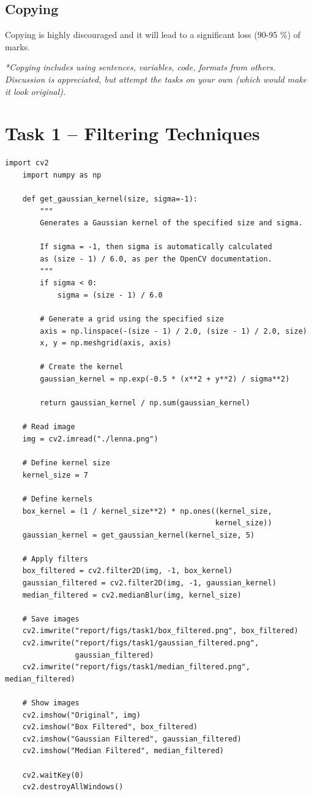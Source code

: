 \documentclass[11pt,a4paper]{article}
\begin{document}
\subsection*{Copying}
Copying is highly discouraged and it will lead to a significant loss  (90-95 \%) of marks.

\textit{*Copying includes using sentences, variables, code, formats from others. Discussion is appreciated, but attempt the tasks on your own (which would make it look original).}

\newpage
\section{Task 1 -- Filtering Techniques}

\begin{lstlisting}[language=iPython, title=Python Code for Filtering Techniques]
    import cv2
    import numpy as np
    
    def get_gaussian_kernel(size, sigma=-1):
        """
        Generates a Gaussian kernel of the specified size and sigma.
    
        If sigma = -1, then sigma is automatically calculated
        as (size - 1) / 6.0, as per the OpenCV documentation.
        """
        if sigma < 0:
            sigma = (size - 1) / 6.0
    
        # Generate a grid using the specified size
        axis = np.linspace(-(size - 1) / 2.0, (size - 1) / 2.0, size)
        x, y = np.meshgrid(axis, axis)
    
        # Create the kernel
        gaussian_kernel = np.exp(-0.5 * (x**2 + y**2) / sigma**2)
    
        return gaussian_kernel / np.sum(gaussian_kernel)
    
    # Read image
    img = cv2.imread("./lenna.png")
    
    # Define kernel size
    kernel_size = 7
    
    # Define kernels
    box_kernel = (1 / kernel_size**2) * np.ones((kernel_size, 
                                                kernel_size))
    gaussian_kernel = get_gaussian_kernel(kernel_size, 5)
    
    # Apply filters
    box_filtered = cv2.filter2D(img, -1, box_kernel)
    gaussian_filtered = cv2.filter2D(img, -1, gaussian_kernel)
    median_filtered = cv2.medianBlur(img, kernel_size)
    
    # Save images
    cv2.imwrite("report/figs/task1/box_filtered.png", box_filtered)
    cv2.imwrite("report/figs/task1/gaussian_filtered.png",
                gaussian_filtered)
    cv2.imwrite("report/figs/task1/median_filtered.png", median_filtered)
    
    # Show images
    cv2.imshow("Original", img)
    cv2.imshow("Box Filtered", box_filtered)
    cv2.imshow("Gaussian Filtered", gaussian_filtered)
    cv2.imshow("Median Filtered", median_filtered)
    
    cv2.waitKey(0)
    cv2.destroyAllWindows()
\end{lstlisting}
\end{document}
